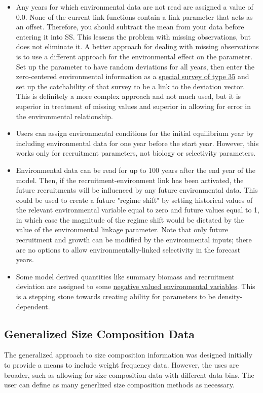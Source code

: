 	\begin{itemize}
		\item Any years for which environmental data are not read are assigned a value of 0.0. None of the current link functions contain a link parameter that acts as an offset.  Therefore, you should subtract the mean from your data before entering it into SS.  This lessens the problem with missing observations, but does not eliminate it. A better approach for dealing with missing observations is to use a different approach for the environmental effect on the parameter.  Set up the parameter to have random deviations for all years, then enter the zero-centered environmental information as a \hyperlink{SpecialSurvey}{special survey of type 35} and set up the catchability of that survey to be a link to the deviation vector.  This is definitely a more complex approach and not much used, but it is superior in treatment of missing values and superior in allowing for error in the environmental relationship.
		\item Users can assign environmental conditions for the initial equilibrium year by including environmental data for one year before the start year. However, this works only for recruitment parameters, not biology or selectivity parameters.
		\item Environmental data can be read for up to 100 years after the end year of the model. Then, if the recruitment-environment link has been activated, the future recruitments will be influenced by any future environmental data. This could be used to create a future "regime shift" by setting historical values of the relevant environmental variable equal to zero and future values equal to 1, in which case the magnitude of the regime shift would be dictated by the value of the environmental linkage parameter. Note that only future recruitment and growth can be modified by the environmental inputs; there are no options to allow environmentally-linked selectivity in the forecast years.
		\item Some model derived quantities like summary biomass and recruitment deviation are assigned to some \hyperlink{EnvVar}{negative valued environmental variables}. This is a stepping stone towards creating ability for parameters to be density-dependent. 
	\end{itemize}

\subsection{Generalized Size Composition Data}
The generalized approach to size composition information was designed initially to provide a means to include weight frequency data. However, the uses are broader, such as allowing for size composition data with different data bins. The user can define as many generlized size composition methods as necessary.

